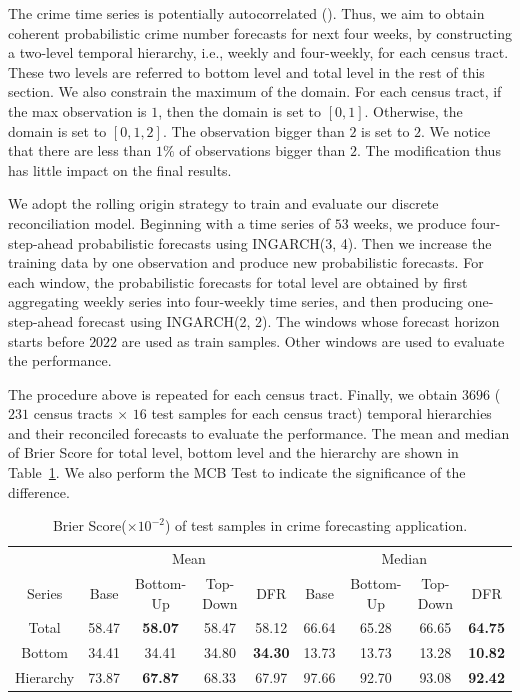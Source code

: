 \documentclass[a4paper,review,12pt,authoryear]{elsarticle}
\begin{document}
The crime time series is potentially autocorrelated (\citealp{aldor-noimanSpatioTemporalLowCount2013}). Thus, we aim to obtain coherent probabilistic crime number forecasts for next four weeks, by constructing a two-level temporal hierarchy, i.e., weekly and four-weekly, for each census tract. These two levels are referred to bottom level and total level in the rest of this section. We also constrain the maximum of the domain. For each census tract, if the max observation is $1$, then the domain is set to $[0, 1]$. Otherwise, the domain is set to $[0, 1, 2]$. The observation bigger than $2$ is set to $2$. We notice that there are less than $1\%$ of observations bigger than $2$. The modification thus has little impact on the final results.

We adopt the rolling origin strategy to train and evaluate our discrete reconciliation model. Beginning with a time series of $53$ weeks, we produce four-step-ahead probabilistic forecasts using INGARCH(3, 4). Then we increase the training data by one observation and produce new probabilistic forecasts. 
For each window, the probabilistic forecasts for total level are obtained by first aggregating weekly series into four-weekly time series, and then producing one-step-ahead forecast using INGARCH(2, 2).
The windows whose forecast horizon starts before $2022$ are used as train samples. Other windows are used to evaluate the performance.

The procedure above is repeated for each census tract. Finally, we obtain $3696$ ($231$ census tracts $\times$ $16$ test samples for each census tract) temporal hierarchies and their reconciled forecasts to evaluate the performance. The mean and median of Brier Score for total level, bottom level and the hierarchy are shown in Table~\ref{tab:crime_bs}. We also perform the MCB Test to indicate the significance of the difference.


\begin{table}[h]
  \centering
  \caption{\label{tab:crime_bs} Brier Score($\times 10^{-2}$) of test samples in crime forecasting application.}
  \begin{tabular}{ccccccccc}
  \toprule
  &\multicolumn{4}{c}{Mean} 
  & \multicolumn{4}{c}{Median} \\ \cmidrule(lr){2-5} \cmidrule(lr){6-9}
  Series & Base & Bottom-Up & Top-Down & DFR &  Base & Bottom-Up & Top-Down & DFR \\\midrule
  Total & 58.47 & \textbf{58.07} & 58.47 & 58.12 & 66.64 & 65.28 & 66.65 & \textbf{64.75} \\
  Bottom & 34.41 & 34.41 & 34.80 & \textbf{34.30} & 13.73 & 13.73 & 13.28 & \textbf{10.82}\\
  Hierarchy & 73.87 & \textbf{67.87} & 68.33 & 67.97 & 97.66 & 92.70 & 93.08 & \textbf{92.42}\\
  \bottomrule
  \end{tabular}
  \end{table}
\end{document}
